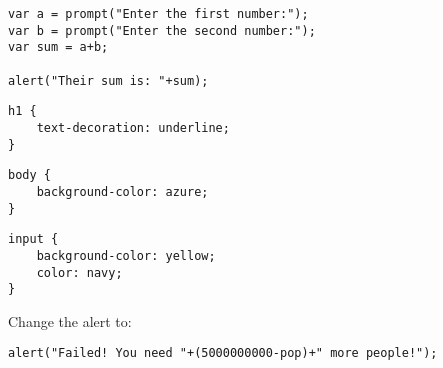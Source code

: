 \documentclass[]{memoir}
\begin{document}

\begin{lstlisting}
var a = prompt("Enter the first number:");
var b = prompt("Enter the second number:");
var sum = a+b;

alert("Their sum is: "+sum);
\end{lstlisting}


\begin{lstlisting}
h1 {
    text-decoration: underline;
}
\end{lstlisting}


\begin{lstlisting}
body {
    background-color: azure;
}
\end{lstlisting}


\begin{lstlisting}
input {
    background-color: yellow;
    color: navy;
}
\end{lstlisting}


Change the alert to:

\begin{lstlisting}
alert("Failed! You need "+(5000000000-pop)+" more people!");
\end{lstlisting}
\end{document}
